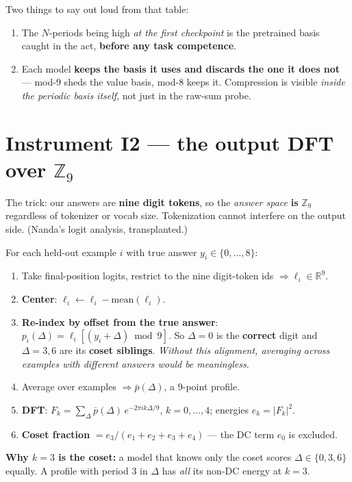 \documentclass[11pt]{article}
\begin{document}
Two things to say out loud from that table:
\begin{enumerate}[leftmargin=*,itemsep=2pt]
\item The $N$-periods being high \emph{at the first checkpoint} is the pretrained
basis caught in the act, \textbf{before any task competence}.
\item Each model \textbf{keeps the basis it uses and discards the one it does
not} --- mod-9 sheds the value basis, mod-8 keeps it. Compression is visible
\emph{inside the periodic basis itself}, not just in the raw-sum probe.
\end{enumerate}

\section{Instrument I2 --- the output DFT over $\mathbb{Z}_9$}

The trick: our answers are \textbf{nine digit tokens}, so the \emph{answer space}
\textbf{is} $\mathbb{Z}_9$ regardless of tokenizer or vocab size. Tokenization
cannot interfere on the output side. (Nanda's logit analysis, transplanted.)

For each held-out example $i$ with true answer $y_i \in \{0,\dots,8\}$:
\begin{enumerate}[leftmargin=*,itemsep=2pt]
\item Take final-position logits, restrict to the nine digit-token ids
$\Rightarrow \ell_i \in \mathbb{R}^9$.
\item \textbf{Center}: $\ell_i \leftarrow \ell_i - \mathrm{mean}(\ell_i)$.
\item \textbf{Re-index by offset from the true answer}:
$p_i(\Delta) = \ell_i[(y_i + \Delta) \bmod 9]$.
So $\Delta = 0$ is the \textbf{correct} digit and $\Delta = 3, 6$ are its
\textbf{coset siblings}. \emph{Without this alignment, averaging across examples
with different answers would be meaningless.}
\item Average over examples $\Rightarrow \bar{p}(\Delta)$, a 9-point profile.
\item \textbf{DFT}: $F_k = \sum_\Delta \bar{p}(\Delta)\, e^{-2\pi i k \Delta/9}$,
$k = 0,\dots,4$; energies $e_k = |F_k|^2$.
\item \textbf{Coset fraction} $= e_3 / (e_1 + e_2 + e_3 + e_4)$ --- the DC term
$e_0$ is excluded.
\end{enumerate}

\textbf{Why $k=3$ is the coset:} a model that knows only the coset scores
$\Delta \in \{0,3,6\}$ equally. A profile with period 3 in $\Delta$ has
\emph{all} its non-DC energy at $k=3$.
\end{document}

